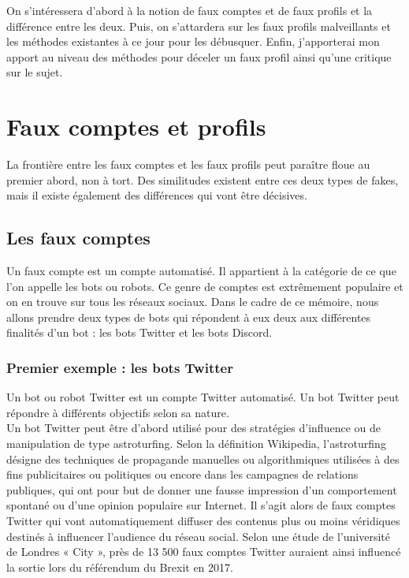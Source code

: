 \documentclass[12pt]{report}
\begin{document}
On s'intéressera d'abord à la notion de faux comptes et de faux profils et la différence entre les deux. Puis, on s'attardera sur les faux profils malveillants et les méthodes existantes à ce jour pour les débusquer. Enfin, j'apporterai mon apport au niveau des méthodes pour déceler un faux profil ainsi qu'une critique sur le sujet.

\chapter{Faux comptes et profils}
La frontière entre les faux comptes et les faux profils peut paraître floue au premier abord, non à tort. Des similitudes existent entre ces deux types de fakes, mais il existe également des différences qui vont être décisives. 

\section{Les faux comptes}
Un faux compte est un compte automatisé. Il appartient à la catégorie de ce que l'on appelle les bots ou robots. Ce genre de comptes est extrêmement populaire et on en trouve sur tous les réseaux sociaux. Dans le cadre de ce mémoire, nous allons prendre deux types de bots qui répondent à eux deux aux différentes finalités d'un bot : les bots Twitter et les bots Discord. \\

\subsection{Premier exemple : les bots Twitter}
Un bot ou robot Twitter est un compte Twitter automatisé. Un bot Twitter peut répondre à différents objectifs selon sa nature. \\

Un bot Twitter peut être d’abord utilisé pour des stratégies d’influence ou de manipulation de type astroturfing. Selon la définition Wikipedia, l'astroturfing désigne des techniques de propagande manuelles ou algorithmiques utilisées à des fins publicitaires ou politiques ou encore dans les campagnes de relations publiques, qui ont pour but de donner une fausse impression d'un comportement spontané ou d'une opinion populaire sur Internet. Il s’agit alors de faux comptes Twitter qui vont automatiquement diffuser des contenus plus ou moins véridiques destinés à influencer l’audience du réseau social. Selon une étude de l’université de Londres « City », près de 13 500 faux comptes Twitter auraient ainsi influencé la sortie lors du référendum du Brexit en 2017.\\
\end{document}
